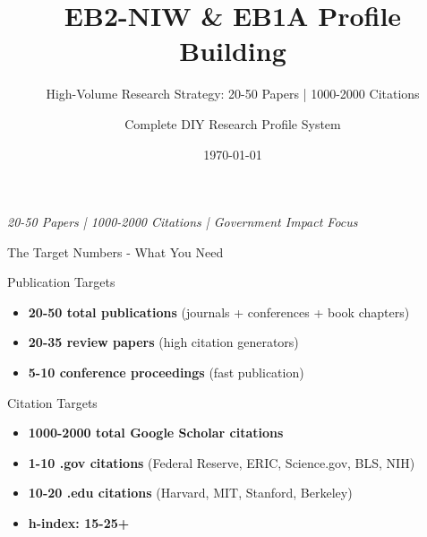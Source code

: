 \documentclass[11pt]{beamer}
\title{EB2-NIW \& EB1A Profile Building}
\subtitle{High-Volume Research Strategy: 20-50 Papers | 1000-2000 Citations}
\author{Complete DIY Research Profile System}
\date{\today}
\begin{document}
	
	\begin{frame}
		\titlepage
		\centering
		\scriptsize \textit{20-50 Papers | 1000-2000 Citations | Government Impact Focus}
	\end{frame}
	
	\begin{frame}{The Target Numbers - What You Need}
		\scriptsize
		\begin{block}{Publication Targets}
			\begin{itemize}
				\item \textbf{20-50 total publications} (journals + conferences + book chapters)
				\item \textbf{20-35 review papers} (high citation generators)
				\item \textbf{5-10 conference proceedings} (fast publication)
			\end{itemize}
		\end{block}
		\begin{block}{Citation Targets}
			\begin{itemize}
				\item \textbf{1000-2000 total Google Scholar citations}
				\item \textbf{1-10 .gov citations} (Federal Reserve, ERIC, Science.gov, BLS, NIH)
				\item \textbf{10-20 .edu citations} (Harvard, MIT, Stanford, Berkeley)
				\item \textbf{h-index: 15-25+}
			\end{itemize}
		\end{block}
	\end{frame}
	
\end{document}
